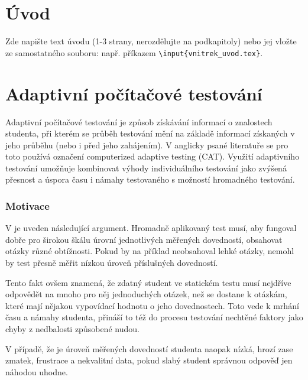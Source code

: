 \documentclass[a4paper,twoside,12pt]{scrbook}
\begin{document}
\chapter*{Úvod} %
%
Zde napište text úvodu (1-3 strany, nerozdělujte na podkapitoly) nebo jej vložte ze samostatného souboru: např. příkazem \texttt{\textbackslash input\{vnitrek\_uvod.tex\}}.
%
%

\chapter{Adaptivní počítačové testování}
Adaptivní počítačové testování je způsob získávání informací o znalostech studenta, při kterém se průběh testování mění na základě informací získaných v jeho průběhu (nebo i před jeho zahájením). V anglicky psané literatuře se pro toto používá označení computerized adaptive testing (CAT). Využití adaptivního testování umožňuje kombinovat výhody individuálního testování jako zvýšená přesnost a úspora času i námahy testovaného s možností hromadného testování. \cite{almond_tlustospis}%

\subsection{Motivace}
V \cite[strana~10]{Wainer2000} je uveden následující argument. Hromadně aplikovaný test musí, aby fungoval dobře pro širokou škálu úrovní jednotlivých měřených dovedností, obsahovat otázky různé obtížnosti. Pokud by na příklad neobsahoval lehké otázky, nemohl by test přesně měřit nízkou úroveň příslušných dovedností.

Tento fakt ovšem znamená, že zdatný student ve statickém testu musí nejdříve odpovědět na mnoho pro něj jednoduchých otázek, než se dostane k otázkám, které mají nějakou vypovídací hodnotu o jeho dovednostech. Toto vede k mrhání času a námahy studenta, přináší to též do procesu testování nechtěné faktory jako chyby z nedbalosti způsobené nudou.

V případě, že je úroveň měřených dovedností studenta naopak nízká, hrozí zase zmatek, frustrace a nekvalitní data, pokud slabý student správnou odpověď jen náhodou uhodne.
\end{document}
